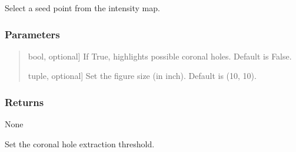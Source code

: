 \documentclass[letterpaper,10pt,english]{sphinxmanual}
\begin{document}
\begin{fulllineitems}
\begin{fulllineitems}
\end{fulllineitems}


\begin{fulllineitems}
\label{\detokenize{pycatch/pycatch:pycatch.pycatch.pycatch.select}}
\pysigstartsignatures
{}
\pysigstopsignatures
\sphinxAtStartPar
Select a seed point from the intensity map.


\subsubsection{Parameters}
\label{\detokenize{pycatch/pycatch:id29}}\begin{quote}
\begin{description}
\sphinxlineitem{hint}{[}bool, optional{]}
\sphinxAtStartPar
If True, highlights possible coronal holes. Default is False.

\sphinxlineitem{fsize}{[}tuple, optional{]}
\sphinxAtStartPar
Set the figure size (in inch). Default is (10, 10).

\end{description}
\end{quote}


\subsubsection{Returns}
\label{\detokenize{pycatch/pycatch:id30}}
\sphinxAtStartPar
None

\end{fulllineitems}


\begin{fulllineitems}
\label{\detokenize{pycatch/pycatch:pycatch.pycatch.pycatch.set_threshold}}
\pysigstartsignatures
{}
\pysigstopsignatures
\sphinxAtStartPar
Set the coronal hole extraction threshold.



\end{fulllineitems}
\end{fulllineitems}
\end{document}
